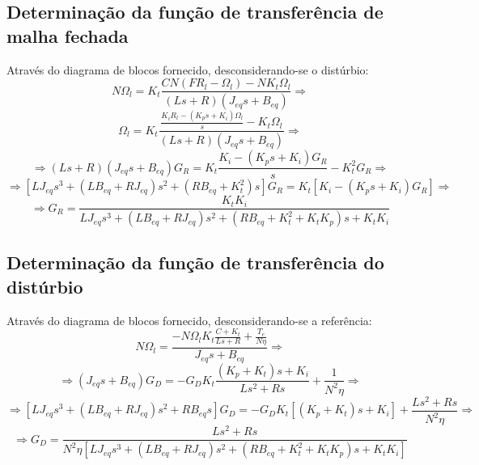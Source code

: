 \documentclass{article}[twocolumn]
\begin{document}
	\subsection{Determina\c{c}\~ao da fun\c{c}\~ao de transfer\^encia de malha fechada}
	Atrav\'es do diagrama de blocos fornecido, desconsiderando-se o dist\'urbio:
	\begin{equation}
		N\Omega_l = K_t\frac{CN(FR_l - \Omega_l) - NK_t\Omega_l}
		{(Ls + R)(J_{eq}s + B_{eq})} \Rightarrow
		\nonumber
	\end{equation}
	\begin{equation}
		\Omega_l = K_t\frac{\frac{K_iR_l - (K_ps + K_i)\Omega_l}{s} - K_t\Omega_l}
		{(Ls + R)(J_{eq}s + B_{eq})} \Rightarrow
		\nonumber
	\end{equation}
	\begin{equation}
		\Rightarrow
		(Ls + R)(J_{eq}s + B_{eq})G_R =
		K_t\frac{K_i - (K_ps + K_i)G_R}{s} - K_t^2G_R \Rightarrow
		\nonumber
	\end{equation}
	\begin{equation}
		\Rightarrow [LJ_{eq}s^3 + (LB_{eq} + RJ_{eq})s^2 + (RB_{eq} + K_t^2)s]G_R =
		K_t[K_i - (K_ps + K_i)G_R]
		\Rightarrow
		\nonumber
	\end{equation}
	\begin{equation}
		\Rightarrow G_R = \frac{K_tK_i}
		{LJ_{eq}s^3 + (LB_{eq} + RJ_{eq})s^2 + (RB_{eq} + K_t^2 + K_tK_p)s + K_tK_i}
		\nonumber
	\end{equation}
	\subsection{Determina\c{c}\~ao da fun\c{c}\~ao de transfer\^encia do dist\'urbio}
	Atrav\'es do diagrama de blocos fornecido, desconsiderando-se a refer\^encia:
	\begin{equation}
		N\Omega_l = \frac{-N\Omega_lK_t\frac{C + K_t}
		{Ls + R} + \frac{T_e}{N\eta}}{J_{eq}s + B_{eq}} \Rightarrow
		\nonumber
	\end{equation}
	\begin{equation}
		\Rightarrow (J_{eq}s + B_{eq})G_D = -G_DK_t\frac{(K_p + K_t)s + K_i}
		{Ls^2 + Rs} + \frac{1}{N^2\eta} \Rightarrow
		\nonumber
	\end{equation}
	\begin{equation}
		\Rightarrow [LJ_{eq}s^3 + (LB_{eq} + RJ_{eq})s^2 + RB_{eq}s]G_D =
		-G_DK_t[(K_p + K_t)s + K_i] + \frac{Ls^2 + Rs}{N^2\eta} \Rightarrow
		\nonumber
	\end{equation}
	\begin{equation}
		\Rightarrow G_D = \frac{Ls^2 + Rs}
		{N^2\eta[LJ_{eq}s^3 + (LB_{eq} + RJ_{eq})s^2 + (RB_{eq} + K_t^2 + K_tK_p)s + K_tK_i]}
		\nonumber
	\end{equation}
\end{document}
